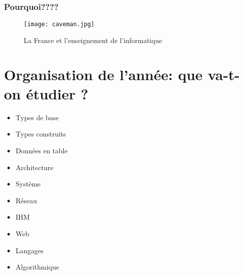 \documentclass[french]{beamer}
\begin{document}
\begin{frame}\frametitle{Pourquoi????}


  \begin{figure}
\centering
\texttt{[image: caveman.jpg]}
\caption{La France et l'enseignement de l'informatique}
\end{figure}
  
\end{frame}


\section{Organisation de l'année: que va-t-on étudier ?}

\begin{frame}
\protect\hypertarget{organisation-de-lannuxe9e-que-va-t-on-uxe9tudier}{}



\begin{itemize}
\tightlist
\item
  Types de base
\item
  Types construits
\item
  Données en table
\item
  Architecture
\item
  Système
\item
  Réseau
\item
  IHM
\item
  Web
\item
  Langages
\item
  Algorithmique
\end{itemize}

\end{frame}
\end{document}
